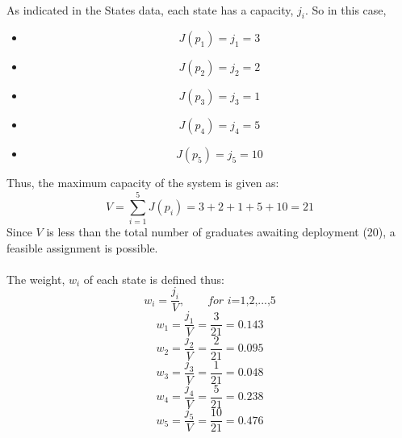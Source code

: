 \documentclass[a4paper]{book}
\begin{document}
			\paragraph{}
				As indicated in the States data, each state has a capacity, $j_i$. So in this case,
				\begin{itemize}
					\item[ ] \[J(p_1) = j_1 = 3\]
					\item[ ] \[J(p_2) = j_2 = 2\]
					\item[ ] \[J(p_3) = j_3 = 1\]
					\item[ ] \[J(p_4) = j_4 = 5\]
					\item[ ] \[J(p_5) = j_5 = 10\]
				\end{itemize}
				Thus, the maximum capacity of the system is given as:
				\begin{equation}
					V = \sum_{i=1}^{5}{J(p_i)} = 3 + 2 + 1 + 5 + 10 = 21
				\end{equation}
			Since $V$ is less than the total number of graduates awaiting deployment (20), a feasible assignment is possible.
			\paragraph{}
				The weight, $w_i$ of each state is defined thus:
				\begin{equation}
					w_i = \frac{j_i}{V}, \qquad \textit{for i=1,2,...,5}
				\end{equation}
				\begin{equation}
					w_1 = \frac{j_1}{V} = \frac{3}{21} = 0.143
				\end{equation}
				\begin{equation}
					w_2 = \frac{j_2}{V} = \frac{2}{21} = 0.095
				\end{equation}
				\begin{equation}
					w_3 = \frac{j_3}{V} = \frac{1}{21} = 0.048
				\end{equation}
				\begin{equation}
					w_4 = \frac{j_4}{V} = \frac{5}{21} = 0.238
				\end{equation}
				\begin{equation}
					w_5 = \frac{j_5}{V} = \frac{10}{21} = 0.476
				\end{equation}
\end{document}
